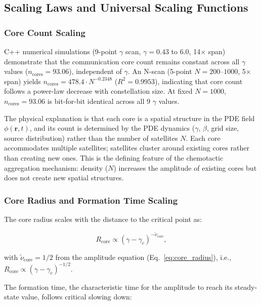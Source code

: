 \documentclass[sn-nature,pdflatex]{sn-jnl}
\begin{document}
\subsection{Scaling Laws and Universal Scaling Functions}
\label{sec:scaling}

\subsubsection{Core Count Scaling}

C++ numerical simulations (9-point $\gamma$ scan, $\gamma=0.43$ to $6.0$, 14$\times$ span) demonstrate that the communication core count remains constant across all $\gamma$ values ($n_{\text{cores}} = 93.06$), independent of $\gamma$.
An N-scan (5-point $N=200$--$1000$, 5$\times$ span) yields $n_{\text{cores}} = 478.4 \cdot N^{-0.2348}$ ($R^2=0.9953$), indicating that core count follows a power-law decrease with constellation size. At fixed $N=1000$, $n_{\text{cores}} = 93.06$ is bit-for-bit identical across all 9 $\gamma$ values.

The physical explanation is that each core is a spatial structure in the PDE field $\phi(\mathbf{r},t)$, and its count is determined by the PDE dynamics ($\gamma$, $\beta$, grid size, source distribution) rather than the number of satellites $N$.
Each core accommodates multiple satellites; satellites cluster around existing cores rather than creating new ones.
This is the defining feature of the chemotactic aggregation mechanism: density ($N$) increases the amplitude of existing cores but does not create new spatial structures.

\subsubsection{Core Radius and Formation Time Scaling}

The core radius scales with the distance to the critical point as:

\begin{equation}
R_{\text{core}} \propto (\gamma - \gamma_c)^{-\tilde{\nu}_{\text{core}}},
\end{equation}

with $\tilde{\nu}_{\text{core}} = 1/2$ from the amplitude equation (Eq.~\ref{eq:core_radius}), i.e., $R_{\text{core}} \propto (\gamma-\gamma_c)^{-1/2}$.

The formation time, the characteristic time for the amplitude to reach its steady-state value, follows critical slowing down:
\end{document}
